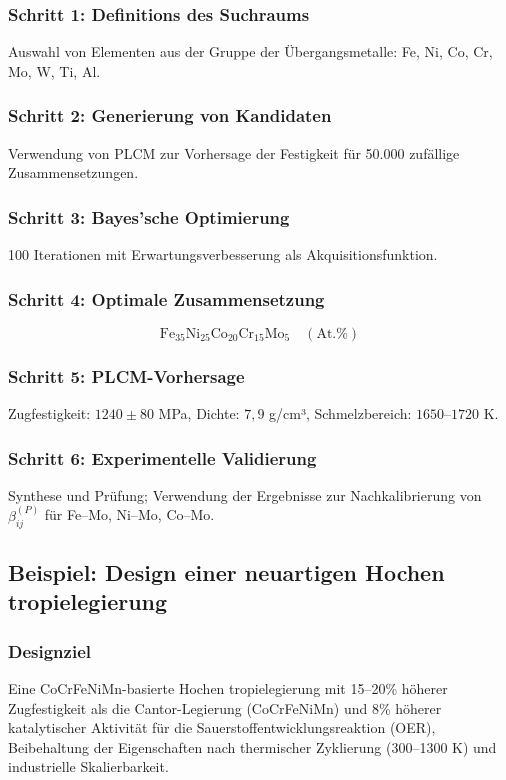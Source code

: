 \documentclass[12pt,a4paper]{article}
\begin{document}
\subsubsection{Schritt 1: Definitions des Suchraums}
Auswahl von Elementen aus der Gruppe der Übergangsmetalle: Fe, Ni, Co, Cr, Mo, W, Ti, Al.

\subsubsection{Schritt 2: Generierung von Kandidaten}
Verwendung von PLCM zur Vorhersage der Festigkeit für 50.000 zufällige Zusammensetzungen.

\subsubsection{Schritt 3: Bayes'sche Optimierung}
100 Iterationen mit Erwartungsverbesserung als Akquisitionsfunktion.

\subsubsection{Schritt 4: Optimale Zusammensetzung}
\[
\text{Fe}_{35}\text{Ni}_{25}\text{Co}_{20}\text{Cr}_{15}\text{Mo}_{5} \quad (\text{At.}\%)
\]

\subsubsection{Schritt 5: PLCM-Vorhersage}
Zugfestigkeit: \(1240 \pm 80\) MPa, Dichte: \(7,9\) g/cm³, Schmelzbereich: \(1650\)–\(1720\) K.

\subsubsection{Schritt 6: Experimentelle Validierung}
Synthese und Prüfung; Verwendung der Ergebnisse zur Nachkalibrierung von \(\beta_{ij}^{(P)}\) für Fe–Mo, Ni–Mo, Co–Mo.

\subsection{Beispiel: Design einer neuartigen Hochen tropielegierung}

\subsubsection{Designziel}
Eine CoCrFeNiMn-basierte Hochen tropielegierung mit 15–20\% höherer Zugfestigkeit als die Cantor-Legierung (CoCrFeNiMn) und 8\% höherer katalytischer Aktivität für die Sauerstoffentwicklungsreaktion (OER), Beibehaltung der Eigenschaften nach thermischer Zyklierung (300–1300 K) und industrielle Skalierbarkeit.
\end{document}
